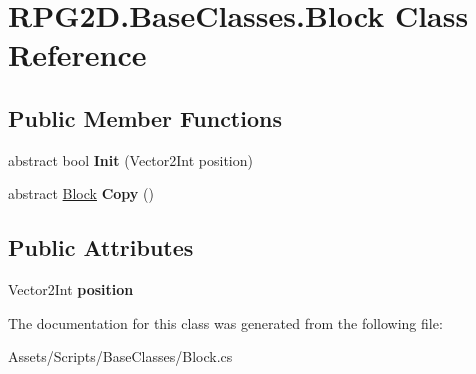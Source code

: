 \hypertarget{class_r_p_g2_d_1_1_base_classes_1_1_block}{}\section{R\+P\+G2\+D.\+Base\+Classes.\+Block Class Reference}
\label{class_r_p_g2_d_1_1_base_classes_1_1_block}
\subsection*{Public Member Functions}
\begin{DoxyCompactItemize}
\item 
\mbox{\label{class_r_p_g2_d_1_1_base_classes_1_1_block_ac2320c31f8f41be781acfa0f22913c25}} 
abstract bool {\bfseries Init} (Vector2\+Int position)
\item 
\mbox{\label{class_r_p_g2_d_1_1_base_classes_1_1_block_aae975d41adf645d7ecc1404304ad8cec}} 
abstract \mbox{\hyperlink{class_r_p_g2_d_1_1_base_classes_1_1_block}{Block}} {\bfseries Copy} ()
\end{DoxyCompactItemize}
\subsection*{Public Attributes}
\begin{DoxyCompactItemize}
\item 
\mbox{\label{class_r_p_g2_d_1_1_base_classes_1_1_block_a4e123147e87cce54f821ec79082a637f}} 
Vector2\+Int {\bfseries position}
\end{DoxyCompactItemize}


The documentation for this class was generated from the following file\+:\begin{DoxyCompactItemize}
\item 
Assets/\+Scripts/\+Base\+Classes/Block.\+cs\end{DoxyCompactItemize}
